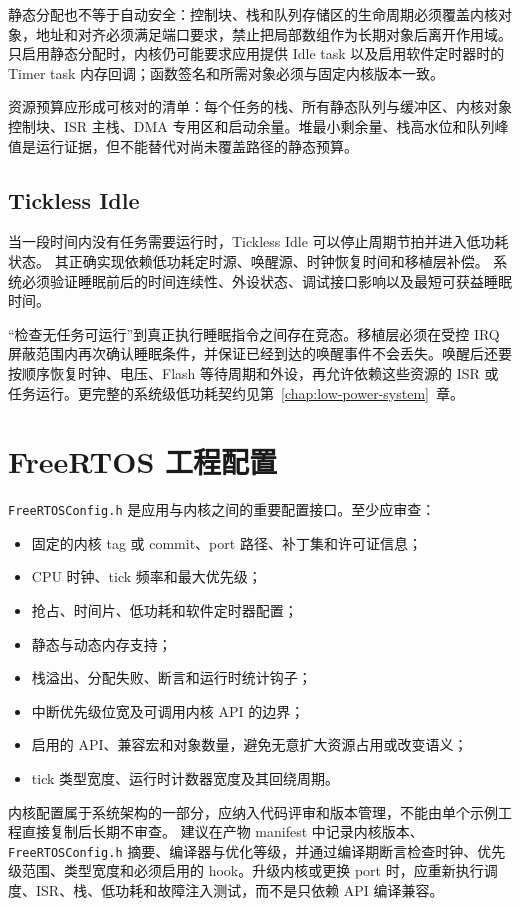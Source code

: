 静态分配也不等于自动安全：控制块、栈和队列存储区的生命周期必须覆盖内核对象，地址和对齐必须满足端口要求，禁止把局部数组作为长期对象后离开作用域。只启用静态分配时，内核仍可能要求应用提供 Idle task 以及启用软件定时器时的 Timer task 内存回调；函数签名和所需对象必须与固定内核版本一致。

资源预算应形成可核对的清单：每个任务的栈、所有静态队列与缓冲区、内核对象控制块、ISR 主栈、DMA 专用区和启动余量。堆最小剩余量、栈高水位和队列峰值是运行证据，但不能替代对尚未覆盖路径的静态预算。

\subsection{Tickless Idle}

当一段时间内没有任务需要运行时，Tickless Idle 可以停止周期节拍并进入低功耗状态。
其正确实现依赖低功耗定时源、唤醒源、时钟恢复时间和移植层补偿。
系统必须验证睡眠前后的时间连续性、外设状态、调试接口影响以及最短可获益睡眠时间。

“检查无任务可运行”到真正执行睡眠指令之间存在竞态。移植层必须在受控 IRQ 屏蔽范围内再次确认睡眠条件，并保证已经到达的唤醒事件不会丢失。唤醒后还要按顺序恢复时钟、电压、Flash 等待周期和外设，再允许依赖这些资源的 ISR 或任务运行。更完整的系统级低功耗契约见第~\ref{chap:low-power-system}~章。

\section{FreeRTOS 工程配置}

\texttt{FreeRTOSConfig.h} 是应用与内核之间的重要配置接口。至少应审查：
\begin{itemize}
  \item 固定的内核 tag 或 commit、port 路径、补丁集和许可证信息；
  \item CPU 时钟、tick 频率和最大优先级；
  \item 抢占、时间片、低功耗和软件定时器配置；
  \item 静态与动态内存支持；
  \item 栈溢出、分配失败、断言和运行时统计钩子；
  \item 中断优先级位宽及可调用内核 API 的边界；
  \item 启用的 API、兼容宏和对象数量，避免无意扩大资源占用或改变语义；
  \item tick 类型宽度、运行时计数器宽度及其回绕周期。
\end{itemize}

内核配置属于系统架构的一部分，应纳入代码评审和版本管理，不能由单个示例工程直接复制后长期不审查。
建议在产物 manifest 中记录内核版本、\texttt{FreeRTOSConfig.h} 摘要、编译器与优化等级，并通过编译期断言检查时钟、优先级范围、类型宽度和必须启用的 hook。升级内核或更换 port 时，应重新执行调度、ISR、栈、低功耗和故障注入测试，而不是只依赖 API 编译兼容。

